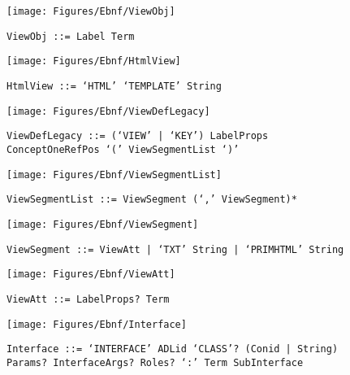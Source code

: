  \begin{figure}[H]
  \centering
  \texttt{[image: Figures/Ebnf/ViewObj]}
  \caption*{\texttt{ViewObj \small::=  Label Term}}
  \label{fig:ebnf-ViewObj}
 \end{figure}

 \begin{figure}[H]
  \centering
  \texttt{[image: Figures/Ebnf/HtmlView]}
  \caption*{\texttt{HtmlView \small::=  `HTML' `TEMPLATE' String}}
  \label{fig:ebnf-HtmlView}
 \end{figure}

 \begin{figure}[H]
  \centering
  \texttt{[image: Figures/Ebnf/ViewDefLegacy]}
  \caption*{\texttt{ViewDefLegacy \small::=  (`VIEW' | `KEY') LabelProps ConceptOneRefPos `(' ViewSegmentList `)'}}
  \label{fig:ebnf-ViewDefLegacy}
 \end{figure}

 \begin{figure}[H]
  \centering
  \texttt{[image: Figures/Ebnf/ViewSegmentList]}
  \caption*{\texttt{ViewSegmentList \small::=  ViewSegment (`,' ViewSegment)*}}
  \label{fig:ebnf-ViewSegmentList}
 \end{figure}

 \begin{figure}[H]
  \centering
  \texttt{[image: Figures/Ebnf/ViewSegment]}
  \caption*{\texttt{ViewSegment \small::=  ViewAtt | `TXT' String | `PRIMHTML' String}}
  \label{fig:ebnf-ViewSegment}
 \end{figure}

 \begin{figure}[H]
  \centering
  \texttt{[image: Figures/Ebnf/ViewAtt]}
  \caption*{\texttt{ViewAtt \small::=  LabelProps? Term}}
  \label{fig:ebnf-ViewAtt}
 \end{figure}

 \begin{figure}[H]
  \centering
  \texttt{[image: Figures/Ebnf/Interface]}
  \caption*{\texttt{Interface \small::=  `INTERFACE' ADLid `CLASS'? (Conid | String) Params? InterfaceArgs? Roles? `:' Term SubInterface}}
  \label{fig:ebnf-Interface}
 \end{figure}

